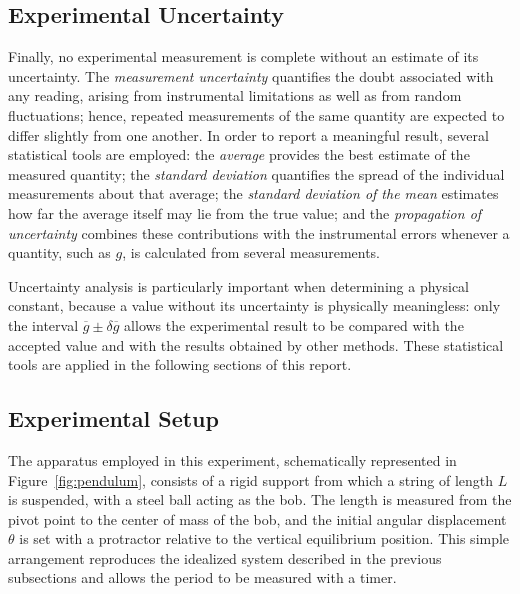 \documentclass[11pt,a4paper]{article}
\begin{document}
\subsection{Experimental Uncertainty}
Finally, no experimental measurement is complete without an estimate of
its uncertainty. The \emph{measurement uncertainty} quantifies the doubt
associated with any reading, arising from instrumental limitations as well
as from random fluctuations; hence, repeated measurements of the same
quantity are expected to differ slightly from one another. In order to
report a meaningful result, several statistical tools are employed: the
\emph{average} provides the best estimate of the measured quantity; the
\emph{standard deviation} quantifies the spread of the individual
measurements about that average; the \emph{standard deviation of the mean}
estimates how far the average itself may lie from the true value; and the
\emph{propagation of uncertainty} combines these contributions with the
instrumental errors whenever a quantity, such as $g$, is calculated from
several measurements.

Uncertainty analysis is particularly important when determining a physical
constant, because a value without its uncertainty is physically
meaningless: only the interval $\overline{g} \pm \delta\overline{g}$
allows the experimental result to be compared with the accepted value and
with the results obtained by other methods. These statistical tools are
applied in the following sections of this report.

\subsection{Experimental Setup}
The apparatus employed in this experiment, schematically represented in
Figure~\ref{fig:pendulum}, consists of a rigid support from which a string
of length $L$ is suspended, with a steel ball acting as the bob. The
length is measured from the pivot point to the center of mass of the bob,
and the initial angular displacement $\theta$ is set with a protractor
relative to the vertical equilibrium position. This simple arrangement
reproduces the idealized system described in the previous subsections and
allows the period to be measured with a timer.
\end{document}
